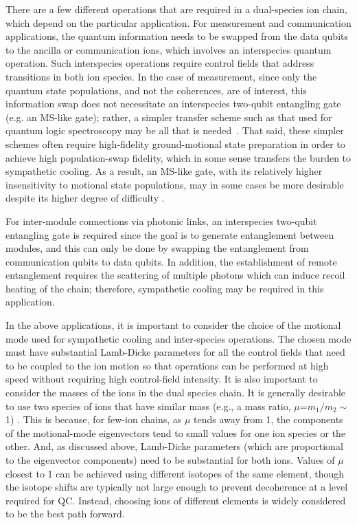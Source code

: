 \documentclass[%
reprint,
 amsmath,amssymb,
]{revtex4-1}
\begin{document}
There are a few different operations that are required in a dual-species ion chain, which depend on the particular application.  For measurement and communication applications, the quantum information needs to be swapped from the data qubits to the ancilla or communication ions, which involves an interspecies quantum operation.  Such interspecies operations require control fields that address transitions in both ion species.  In the case of measurement, since only the quantum state populations, and not the coherences, are of interest, this information swap does not necessitate an interspecies two-qubit entangling gate (e.g. an MS-like gate); rather, a simpler transfer scheme such as that used for quantum logic spectroscopy may be all that is needed~\cite{SchmidtQuantumLogicSpectroscopy, BruzewiczQLAR2017}.  That said, these simpler schemes often require high-fidelity ground-motional state preparation in order to achieve high population-swap fidelity, which in some sense transfers the burden to sympathetic cooling.  As a result, an MS-like gate, with its relatively higher insensitivity to motional state populations, may in some cases be more desirable despite its higher degree of difficulty .

For inter-module connections via photonic links, an interspecies two-qubit entangling gate is required since the goal is to generate entanglement between modules, and this can only be done by swapping the entanglement from communication qubits to data qubits.  In addition, the establishment of remote entanglement requires the scattering of multiple photons which can induce recoil heating of the chain; therefore, sympathetic cooling may be required in this application.

In the above applications, it is important to consider the choice of the motional mode used for sympathetic cooling and inter-species operations.  The chosen mode must have substantial Lamb-Dicke parameters for all the control fields that need to be coupled to the ion motion so that operations can be performed at high speed without requiring high control-field intensity.  It is also important to consider the masses of the ions in the dual species chain. It is generally desirable to use two species of ions that have similar mass (e.g., a mass ratio, $\mu$=$m_1/m_2\sim$1) \cite{WubennaSympCooling2012, HomeMixedSpecies2013}.  This is because, for few-ion chains, as $\mu$ tends away from 1, the components of the motional-mode eigenvectors tend to small values for one ion species or the other.  And, as discussed above, Lamb-Dicke parameters (which are proportional to the eigenvector components) need to be substantial for both ions. Values of $\mu$ closest to 1 can be achieved using different isotopes of the same element, though the isotope shifts are typically not large enough to prevent decoherence at a level required for QC. Instead, choosing ions of different elements is widely considered to be the best path forward.
\end{document}
